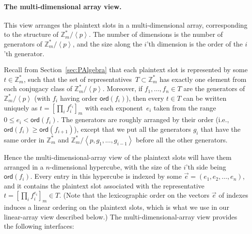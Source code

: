 \documentclass[14pt]{extarticle}
\newcommand{\secref}[1]{Section~\protect\ref{sec:#1}}
\newcommand{\Z}{\mathbb{Z}}
\newcommand{\grp}[1]{\left\langle #1 \right\rangle}
\def\ord{\mathsf{ord}}
\begin{document}
\paragraph{The multi-dimensional array view.}
This view arranges the plaintext slots in a multi-dimensional array,
corresponding to the structure of $\Z_m^*/\grp{p}$. The number of
dimensions is the number of generators of $\Z_m^*/\grp{p}$, and the
size along the $i$'th dimension is the order of the $i$'th generator.

Recall from \secref{PAlgebra} that each plaintext slot is represented
by some $t\in\Z_m^*$, such that the set of representatives~$T\subset
\Z_m^*$ has exactly one element from each conjugacy class of $\Z_m^*/
\grp{p}$. Moreover, if $f_1,\ldots,f_n\in T$ are the generators
of $\Z_m^*/\grp{p}$ (with $f_i$ having order $\ord(f_i)$), then every
$t\in T$ can be written uniquely as $t = [\prod_i f_i^{e_i}]_m$ with
each exponent~$e_i$ taken from the range $0\le e_i<\ord(f_i)$. The
generators are roughly arranged by their order (i.e., $\ord(f_i)
\ge\ord(f_{i+1})$), except that we put all the generators $g_i$ that
have the same order in $\Z_m^*$ and $\Z_m^*/\grp{p,g_1,\ldots,g_{i-1}}$
before all the other generators.

Hence the multi-dimensional-array view of the plaintext slots will
have them arranged in a $n$-dimensional hypercube, with the size of
the $i$'th side being $\ord(f_i)$. Every entry in this hypercube is
indexed by some $\vec{e}=(e_1,e_2,\ldots,e_n)$, and it contains the
plaintext slot associated with the representative $t=[\prod_i
f_i^{e_i}]_m \in T$. (Note that the lexicographic order on the vectors
$\vec{e}$ of indexes induces a linear ordering on the plaintext slots,
which is what we use in our linear-array view described below.) The
multi-dimensional-array view provides the following interfaces:
\end{document}
